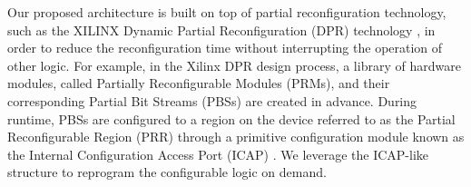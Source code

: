 Our proposed architecture is built on top of partial reconfiguration
technology, such as the XILINX Dynamic Partial Reconfiguration (DPR) technology
\cite{PRUserGuide}, in order to reduce the reconfiguration time without
interrupting the operation of other logic. For example, in the Xilinx DPR
design process, a library of hardware modules, called Partially
Reconfigurable Modules (PRMs), and their corresponding Partial Bit
Streams (PBSs) are created in advance. 
During runtime, PBSs are configured to a region on the device referred to as the
Partial Reconfigurable Region (PRR) through a primitive configuration
module known as the Internal Configuration Access Port (ICAP)
\cite{Hansen:2011dt,Liu:2009ie,McDonald:2008ec}. We leverage the ICAP-like
structure to reprogram the configurable logic on demand.



